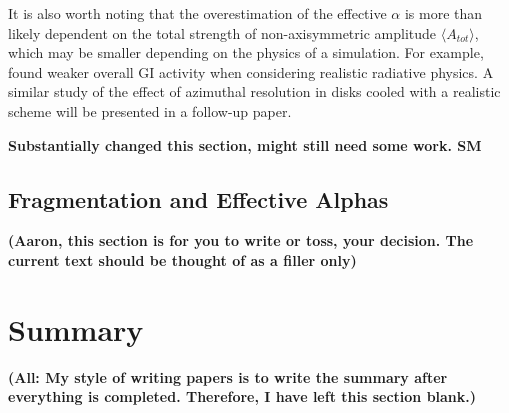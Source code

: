 \documentclass[manuscript]{aastex}
\begin{document}
It is also worth noting that the overestimation of the effective $\alpha$ is more than likely dependent on the total strength of non-axisymmetric amplitude $\langle A_{tot} \rangle$, which may be smaller depending on the physics of a simulation. For example, \citet{boley2006} found weaker overall GI activity when considering realistic radiative physics. A similar study of the effect of azimuthal resolution in disks cooled with a realistic scheme will be presented in a follow-up paper. 

{\bf Substantially changed this section, might still need some work. SM} 

\subsection{Fragmentation and Effective Alphas}

\noindent
{\bf (Aaron, this section is for you to write or toss, your decision.  The current text should be thought of as a filler only)}


\section{Summary}

\noindent
{\bf (All: My style of writing papers is to write the summary after everything is completed.  Therefore, I have left this
section blank.)}
\end{document}

